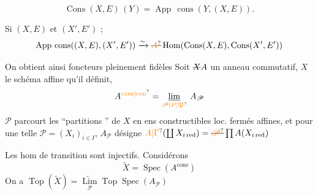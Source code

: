 \[
\operatorname{Cons}(X,E)\,(Y)
 = \operatorname{App}\,\operatorname{cons}(Y,(X,E)).
\]

 
Si  $(X,E)$ et $(X',E')$ ; 
\[
\operatorname{App}\,\operatorname{cons}((X,E),(X',E'))
 \xrightarrow{\sim}
 \deleted{\unsure{A}}\operatorname{Hom}(\operatorname{Cons}(X,E),\operatorname{Cons}(X',E'))
\]

On obtient ainsi  foncteurs pleinement fidèles
Soit $\deleted{X}A$ un anneau commutatif, $X$ le schéma affine qu'il définit,
\[
 A^{\unsure{\mathrm{cons}|\mathrm{con}}}
 =\underset{\unsure{\mathscr{P}|P|\mathfrak P}}{\underline{\lim}}\ A_{\mathscr{P}}
\]
$\mathscr{P}$ parcourt les ``partitions '' de $X$ en ens constructibles loc. fermés  affines, et pour une telle $\mathscr{P}=(X_i)_{i\in I}$, $A_{\mathscr{P}}$ désigne  $\unsure{A|\Gamma}(\coprod X_{i\,\mathrm{red}})=\deleted{\unsure{\mathscr{P}}}\prod A(X_{i\,\mathrm{red}})$

Les hom de transition sont injectifs. Considérons
\[
 \widetilde X=\operatorname{Spec}(A^{\mathrm{cons}})
\]
On a $\operatorname{Top}(\widetilde X)=\underset{\mathscr P}{\underleftarrow{\operatorname{Lim}}}\operatorname{Top}\operatorname{Spec}(A_{\mathscr P})$

